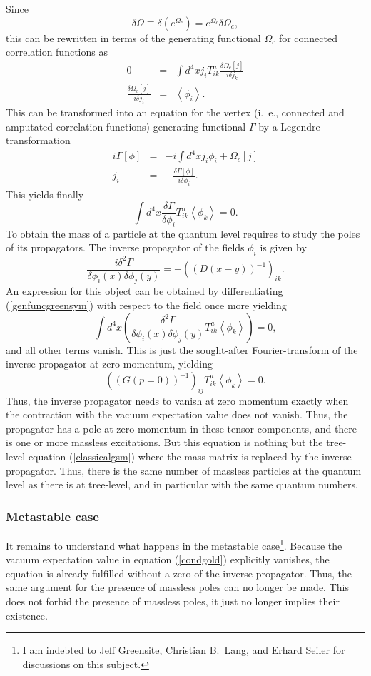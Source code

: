 \documentclass[final,twoside,12pt]{article}
\newcommand*{\no}{\noindent}
\newcommand*{\bea}{\begin{eqnarray}}
\newcommand*{\eea}{\end{eqnarray}}
\newcommand*{\be}{\begin{equation}}
\newcommand*{\ee}{\end{equation}}
\newcommand*{\pref}[1]{(\ref{#1})}
\newcommand*{\nn}{\nonumber}
\newcommand*{\1}{1\!\!\!\bot}
\newcommand*{\la}{\left\langle}
\newcommand*{\ra}{\right\rangle}
\begin{document}
Since
\be
\delta \Omega\equiv\delta\left(e^{\Omega_c}\right)=e^{\Omega_c}\delta \Omega_c\nn,
\ee
\no this can be rewritten in terms of the generating functional $\Omega_c$ for connected correlation functions as
\bea
0&=&\int d^4x j_i T_{ik}^a\frac{\delta \Omega_c[j]}{i\delta j_k}\nn\\
\frac{\delta \Omega_c[j]}{i\delta j_i}&=&\la\phi_i\ra\nn.
\eea
\no This can be transformed into an equation for the vertex (i.\ e., connected and amputated correlation functions) generating functional $\Gamma$ by a Legendre transformation
\bea
i\Gamma[\phi]&=&-i\int d^4 x j_i\phi_i+\Omega_c[j]\nn\\
j_i&=&-\frac{\delta\Gamma[\phi]}{i\delta\phi_i}\label{legendre}.
\eea
\no This yields finally
\be
\int d^4x\frac{\delta\Gamma}{\delta\phi_i} T_{ik}^a\la\phi_k\ra=0\label{genfuncgreensym}.
\ee
\no To obtain the mass of a particle at the quantum level requires to study the poles of its propagators. The inverse propagator of the fields $\phi_i$ is given by
\be
\frac{i\delta^2\Gamma}{\delta\phi_i(x)\delta\phi_j(y)}=-((D(x-y))^{-1})_{ik}.
\ee
\no An expression for this object can be obtained by differentiating \pref{genfuncgreensym} with respect to the field once more yielding \cite{Bohm:2001yx}
\be
\int d^4x\left(\frac{\delta^2\Gamma}{\delta\phi_i(x)\delta\phi_j(y)}T_{ik}^a\la\phi_k\ra\right)=0\nn,
\ee
\no and all other terms vanish. This is just the sought-after Fourier-transform of the inverse propagator at zero momentum, yielding
\be
((G(p=0))^{-1})_{ij}T_{ik}^a\la\phi_k\ra=0\label{condgold}.
\ee
\no Thus, the inverse propagator needs to vanish at zero momentum exactly when the contraction with the vacuum expectation value does not vanish. Thus, the propagator has a pole at zero momentum in these tensor components, and there is one or more massless excitations. But this equation is nothing but the tree-level equation \pref{classicalgsm} where the mass matrix is replaced by the inverse propagator. Thus, there is the same number of massless particles at the quantum level as there is at tree-level, and in particular with the same quantum numbers.

\subsubsection{Metastable case}

It remains to understand what happens in the metastable case\footnote{I am indebted to Jeff Greensite, Christian B.\ Lang, and Erhard Seiler for discussions on this subject.}. Because the vacuum expectation value in equation \pref{condgold} explicitly vanishes, the equation is already fulfilled without a zero of the inverse propagator. Thus, the same argument for the presence of massless poles can no longer be made. This does not forbid the presence of massless poles, it just no longer implies their existence.
\end{document}

